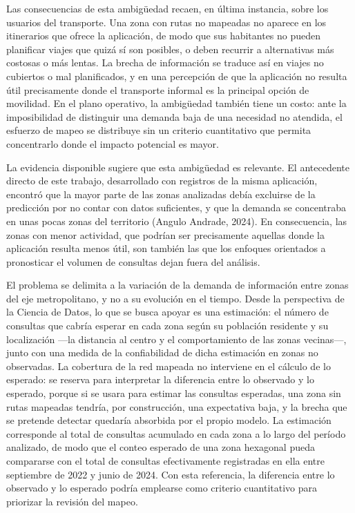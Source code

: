 Las consecuencias de esta ambigüedad recaen, en última instancia, sobre los usuarios del
transporte. Una zona con rutas no mapeadas no aparece en los itinerarios que ofrece la
aplicación, de modo que sus habitantes no pueden planificar viajes que quizá sí son
posibles, o deben recurrir a alternativas más costosas o más lentas. La brecha de
información se traduce así en viajes no cubiertos o mal planificados, y en una percepción
de que la aplicación no resulta útil precisamente donde el transporte informal es la
principal opción de movilidad. En el plano operativo, la ambigüedad también tiene un costo:
ante la imposibilidad de distinguir una demanda baja de una necesidad no atendida, el
esfuerzo de mapeo se distribuye sin un criterio cuantitativo que permita concentrarlo
donde el impacto potencial es mayor.

La evidencia disponible sugiere que esta ambigüedad es relevante. El antecedente directo de
este trabajo, desarrollado con registros de la misma aplicación, encontró que la mayor
parte de las zonas analizadas debía excluirse de la predicción por no contar con datos
suficientes, y que la demanda se concentraba en unas pocas zonas del territorio (Angulo
Andrade, 2024). En consecuencia, las zonas con menor actividad, que podrían ser
precisamente aquellas donde la aplicación resulta menos útil, son también las que los
enfoques orientados a pronosticar el volumen de consultas dejan fuera del análisis.

El problema se delimita a la variación de la demanda de información entre zonas del eje
metropolitano, y no a su evolución en el tiempo. Desde la perspectiva de la Ciencia de
Datos, lo que se busca apoyar es una estimación: el número de consultas que cabría esperar
en cada zona según su población residente y su localización —la distancia al centro y el
comportamiento de las zonas vecinas—, junto con una medida de la confiabilidad de dicha
estimación en zonas no observadas. La cobertura de la red mapeada no interviene en el
cálculo de lo esperado: se reserva para interpretar la diferencia entre lo observado y lo
esperado, porque si se usara para estimar las consultas esperadas, una zona sin rutas
mapeadas tendría, por construcción, una expectativa baja, y la brecha que se pretende
detectar quedaría absorbida por el propio modelo. La estimación corresponde al
total de consultas acumulado en cada zona a lo largo del período analizado, de modo que
el conteo esperado de una zona hexagonal pueda compararse con el total de consultas
efectivamente registradas en ella entre septiembre de 2022 y junio de 2024. Con esta
referencia, la diferencia entre lo observado y lo esperado podría emplearse como criterio
cuantitativo para priorizar la revisión del mapeo.

